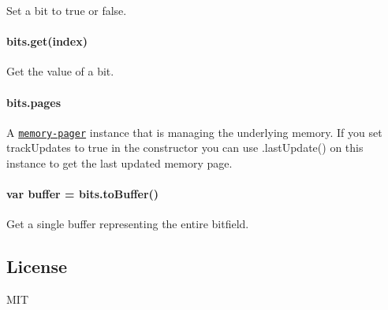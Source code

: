 Set a bit to true or false.

\paragraph*{{\ttfamily bits.\+get(index)}}

Get the value of a bit.

\paragraph*{{\ttfamily bits.\+pages}}

A \href{https://github.com/mafintosh/memory-pager}{\tt memory-\/pager} instance that is managing the underlying memory. If you set {\ttfamily track\+Updates} to true in the constructor you can use {\ttfamily .last\+Update()} on this instance to get the last updated memory page.

\paragraph*{{\ttfamily var buffer = bits.\+to\+Buffer()}}

Get a single buffer representing the entire bitfield.

\subsection*{License}

M\+IT 